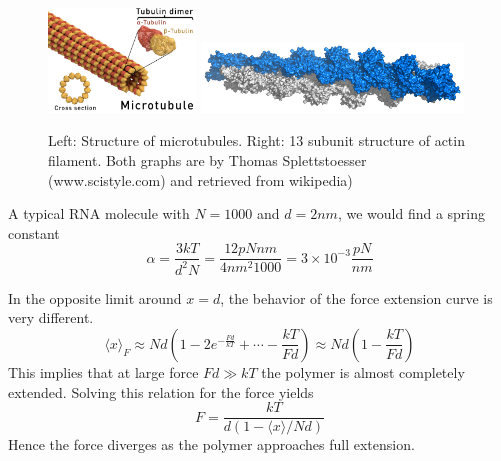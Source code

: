 \begin{figure}[tb]
	\centering
	\includegraphics[width=0.35\textwidth]{figures/Microtubule_structure.jpg}
	\includegraphics[width=0.62\textwidth]{figures/actin_filament.png}
	\caption{Left: Structure of microtubules. Right: 13 subunit structure of actin filament. Both graphs  are by Thomas Splettstoesser (www.scistyle.com) and retrieved from wikipedia)}
	\label{fig:cytoskeleton_structure}
\end{figure}

A typical RNA molecule with $N=1000$ and $d=2nm$, we would find a spring constant
\begin{equation}
\alpha = \frac{3kT}{d^2N} = \frac{12pN nm}{4nm^2 1000} = 3\times 10^{-3}\frac{pN}{nm}
\end{equation}

In the opposite limit around $x=d$, the behavior of the force extension curve is very different.
\begin{equation}
\langle x \rangle_{F} \approx Nd\left(1 - 2e^{-\frac{Fd}{kT}} + \cdots - \frac{kT}{Fd}\right) \approx Nd\left(1 - \frac{kT}{Fd}\right)
\end{equation}
This implies that at large force $Fd\gg kT$ the polymer is almost completely extended.
Solving this relation for the force yields
\begin{equation}
F = \frac{kT}{d(1- \langle x \rangle/Nd)}
\end{equation}
Hence the force diverges as the polymer approaches full extension.


